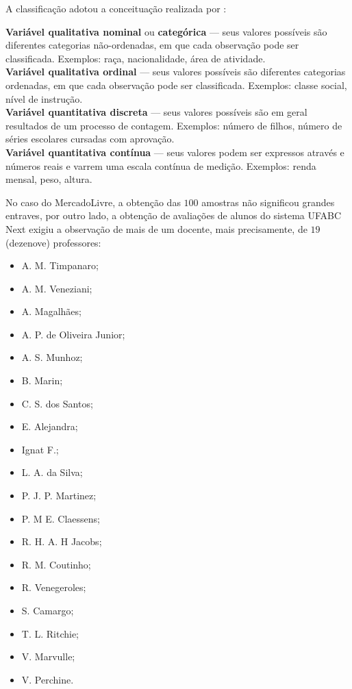     A classificação adotou a conceituação realizada por :
    
    \begin{citacao}
        \textbf{Variável qualitativa nominal} ou \textbf{categórica} --- seus valores possíveis são diferentes categorias não-ordenadas, em que cada observação pode ser classificada. Exemplos: raça, nacionalidade, área de atividade. \\
        \textbf{Variável qualitativa ordinal} --- seus valores possíveis são diferentes categorias ordenadas, em que cada observação pode ser classificada. Exemplos: classe social, nível de instrução. \\
        \textbf{Variável quantitativa discreta} --- seus valores possíveis são em geral resultados de um processo de contagem. Exemplos: número de filhos, número de séries escolares cursadas com aprovação. \\
        \textbf{Variável quantitativa contínua} --- seus valores podem ser expressos através e números reais e varrem uma escala contínua de medição. Exemplos: renda mensal, peso, altura.
    \end{citacao}
    
    No caso do MercadoLivre, a obtenção das $100$ amostras não significou grandes entraves, por outro lado, a obtenção de avaliações de alunos do sistema UFABC Next exigiu a observação de mais de um docente, mais precisamente, de $19$ (dezenove) professores:
    
    \begin{itemize}
        \item A. M. Timpanaro;
        \item A. M. Veneziani;
        \item A. Magalhães;
        \item A. P. de Oliveira Junior;
        \item A. S. Munhoz;
        \item B. Marin;
        \item C. S. dos Santos;
        \item E. Alejandra;
        \item Ignat F.;
        \item L. A. da Silva;
        \item P. J. P. Martinez;
        \item P. M E. Claessens;
        \item R. H. A. H Jacobs;
        \item R. M. Coutinho;
        \item R. Venegeroles;
        \item S. Camargo;
        \item T. L. Ritchie;
        \item V. Marvulle;
        \item V. Perchine.
    \end{itemize}
	
